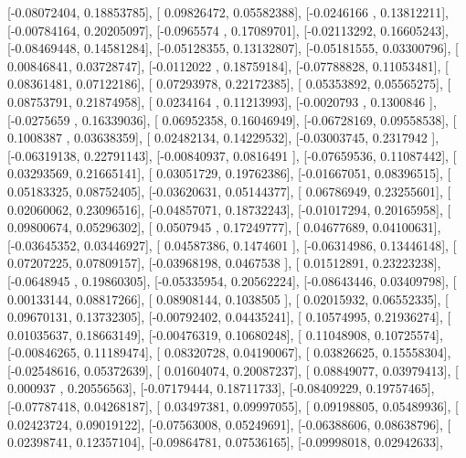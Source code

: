 \documentclass{article}
\begin{document}
       [-0.08072404,  0.18853785],
       [ 0.09826472,  0.05582388],
       [-0.0246166 ,  0.13812211],
       [-0.00784164,  0.20205097],
       [-0.0965574 ,  0.17089701],
       [-0.02113292,  0.16605243],
       [-0.08469448,  0.14581284],
       [-0.05128355,  0.13132807],
       [-0.05181555,  0.03300796],
       [ 0.00846841,  0.03728747],
       [-0.0112022 ,  0.18759184],
       [-0.07788828,  0.11053481],
       [ 0.08361481,  0.07122186],
       [ 0.07293978,  0.22172385],
       [ 0.05353892,  0.05565275],
       [ 0.08753791,  0.21874958],
       [ 0.0234164 ,  0.11213993],
       [-0.0020793 ,  0.1300846 ],
       [-0.0275659 ,  0.16339036],
       [ 0.06952358,  0.16046949],
       [-0.06728169,  0.09558538],
       [ 0.1008387 ,  0.03638359],
       [ 0.02482134,  0.14229532],
       [-0.03003745,  0.2317942 ],
       [-0.06319138,  0.22791143],
       [-0.00840937,  0.0816491 ],
       [-0.07659536,  0.11087442],
       [ 0.03293569,  0.21665141],
       [ 0.03051729,  0.19762386],
       [-0.01667051,  0.08396515],
       [ 0.05183325,  0.08752405],
       [-0.03620631,  0.05144377],
       [ 0.06786949,  0.23255601],
       [ 0.02060062,  0.23096516],
       [-0.04857071,  0.18732243],
       [-0.01017294,  0.20165958],
       [ 0.09800674,  0.05296302],
       [ 0.0507945 ,  0.17249777],
       [ 0.04677689,  0.04100631],
       [-0.03645352,  0.03446927],
       [ 0.04587386,  0.1474601 ],
       [-0.06314986,  0.13446148],
       [ 0.07207225,  0.07809157],
       [-0.03968198,  0.0467538 ],
       [ 0.01512891,  0.23223238],
       [-0.0648945 ,  0.19860305],
       [-0.05335954,  0.20562224],
       [-0.08643446,  0.03409798],
       [ 0.00133144,  0.08817266],
       [ 0.08908144,  0.1038505 ],
       [ 0.02015932,  0.06552335],
       [ 0.09670131,  0.13732305],
       [-0.00792402,  0.04435241],
       [ 0.10574995,  0.21936274],
       [ 0.01035637,  0.18663149],
       [-0.00476319,  0.10680248],
       [ 0.11048908,  0.10725574],
       [-0.00846265,  0.11189474],
       [ 0.08320728,  0.04190067],
       [ 0.03826625,  0.15558304],
       [-0.02548616,  0.05372639],
       [ 0.01604074,  0.20087237],
       [ 0.08849077,  0.03979413],
       [ 0.000937  ,  0.20556563],
       [-0.07179444,  0.18711733],
       [-0.08409229,  0.19757465],
       [-0.07787418,  0.04268187],
       [ 0.03497381,  0.09997055],
       [ 0.09198805,  0.05489936],
       [ 0.02423724,  0.09019122],
       [-0.07563008,  0.05249691],
       [-0.06388606,  0.08638796],
       [ 0.02398741,  0.12357104],
       [-0.09864781,  0.07536165],
       [-0.09998018,  0.02942633],
\end{document}
